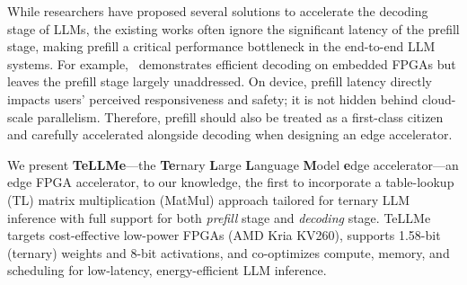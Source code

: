 \documentclass[sigconf]{acmart}
\begin{document}
While researchers have proposed several solutions to accelerate the decoding stage of LLMs, the existing works often ignore the significant  latency of the prefill stage, making prefill a critical performance bottleneck in the end-to-end LLM systems. 
For example,~\cite{li2025pushing} demonstrates efficient decoding on embedded FPGAs but leaves the prefill stage largely unaddressed. On device, prefill latency directly impacts users' perceived responsiveness and safety; it is not hidden behind cloud-scale parallelism. 
Therefore, prefill should also be treated as a first-class citizen and carefully accelerated  alongside decoding when designing an edge accelerator. 


We present \textbf{TeLLMe}—the \textbf{Te}rnary \textbf{L}arge \textbf{L}anguage \textbf{M}odel \textbf{e}dge accelerator—an edge FPGA accelerator, to our knowledge, the first to incorporate a table-lookup (TL) matrix multiplication (MatMul) approach tailored for ternary LLM inference with full support for both \emph{prefill} stage and \emph{decoding} stage. TeLLMe targets cost-effective low-power FPGAs (AMD Kria KV260), supports 1.58-bit (ternary) weights and 8-bit activations, and co-optimizes compute, memory, and scheduling for low-latency, energy-efficient LLM inference.
\end{document}
